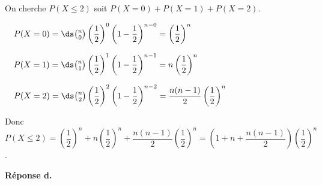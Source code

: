\begin{enumerate}
On cherche $P(X\leqslant 2)$ soit $P(X=0)+P(X=1)+P(X=2)$.
 
\textbullet~~$P(X=0)=\ds\binom{n}{0}\left (\dfrac{1}{2}\right )^0 \left (1-\dfrac{1}{2}\right )^{n-0} = \left (\dfrac{1}{2}\right )^n$

\textbullet~~$P(X=1)=\ds\binom{n}{1}\left (\dfrac{1}{2}\right )^1 \left (1-\dfrac{1}{2}\right )^{n-1} = n \left (\dfrac{1}{2}\right )^n$

\textbullet~~$P(X=2)=\ds\binom{n}{2}\left (\dfrac{1}{2}\right )^2 \left (1-\dfrac{1}{2}\right )^{n-2} = \dfrac{n(n-1)}{2} \left (\dfrac{1}{2}\right )^n$

Donc $P(X\leqslant 2)= \left (\dfrac{1}{2}\right )^n + n \left (\dfrac{1}{2}\right )^n + \dfrac{n(n-1)}{2}\left (\dfrac{1}{2}\right )^n = \left (1+n+\dfrac{n(n-1)}{2}\right )\left (\dfrac{1}{2}\right )^n$.

\hfill\textbf{Réponse d.}
\end{enumerate}
